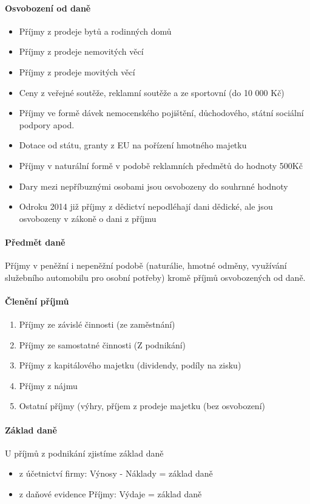 \paragraph{Osvobození od daně}
\begin{itemize}
    \item Příjmy z prodeje bytů a rodinných domů
    \item Příjmy z prodeje nemovitých věcí
    \item Příjmy z prodeje movitých věcí
    \item Ceny z veřejné soutěže, reklamní soutěže a ze sportovní (do 10 000 Kč)
    \item Příjmy ve formě dávek nemocenského pojištění, důchodového, státní sociální podpory apod.
    \item Dotace od státu, granty z EU na pořízení hmotného majetku
    \item Příjmy v naturální formě v podobě reklamních předmětů do hodnoty 500Kč
    \item Dary mezi nepříbuznými osobami jsou osvobozeny do souhrnné hodnoty
    \item Odroku 2014 již příjmy z dědictví nepodléhají dani dědické, ale jsou osvobozeny v zákoně o dani z příjmu
\end{itemize}

\paragraph{Předmět daně} Příjmy v peněžní i nepeněžní podobě (naturálie, hmotné odměny, využívání služebního automobilu pro osobní potřeby) kromě příjmů osvobozených od daně.

\paragraph{Členění příjmů}
\begin{enumerate}
    \item Příjmy ze závislé činnosti (ze zaměstnání)
    \item Příjmy ze samostatné činnosti (Z podnikání)
    \item Příjmy z kapitálového majetku (dividendy, podíly na zisku)
    \item Příjmy z nájmu
    \item Ostatní příjmy (výhry, příjem z prodeje majetku (bez osvobození)
\end{enumerate}

\paragraph{Základ daně}
U příjmů z podnikání zjistíme základ daně
\begin{itemize}
    \item z účetnictví firmy: Výnosy - Náklady = základ daně
    \item z daňové evidence Příjmy: Výdaje = základ daně
\end{itemize}

